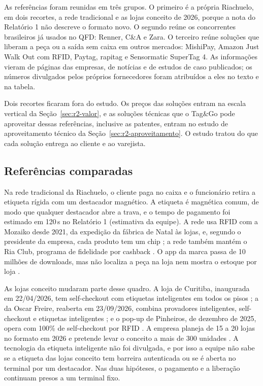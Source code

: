 As referências foram reunidas em três grupos. O primeiro é a própria Riachuelo, em dois recortes, a rede tradicional e as lojas conceito de 2026, porque a nota do Relatório 1 não descreve o formato novo. O segundo reúne os concorrentes brasileiros já usados no QFD: Renner, C\&A e Zara. O terceiro reúne soluções que liberam a peça ou a saída sem caixa em outros mercados: MishiPay, Amazon Just Walk Out com RFID, Paytag, rapitag e Sensormatic SuperTag 4. As informações vieram de páginas das empresas, de notícias e de estudos de caso publicados; os números divulgados pelos próprios fornecedores foram atribuídos a eles no texto e na tabela.

Dois recortes ficaram fora do estudo. Os preços das soluções entram na escala vertical da Seção~\ref{sec:r2-valor}, e as soluções técnicas que o Tag\&Go pode aproveitar dessas referências, inclusive as patentes, entram no estudo de aproveitamento técnico da Seção~\ref{sec:r2-aproveitamento}. O estudo tratou do que cada solução entrega ao cliente e ao varejista.

\subsection{Referências comparadas}
\label{sub:r2-dif-referencias}

Na rede tradicional da Riachuelo, o cliente paga no caixa e o funcionário retira a etiqueta rígida com um destacador magnético. A etiqueta é magnética comum, de modo que qualquer destacador abre a trava, e o tempo de pagamento foi estimado em 120\,s no Relatório 1 (estimativa da equipe). A rede usa RFID com a Mozaiko desde 2021, da expedição da fábrica de Natal às lojas, e, segundo o presidente da empresa, cada produto tem um chip \cite{tiinside2022riachuelo,neofeed2025riachuelo}; a rede também mantém o Ria Club, programa de fidelidade por cashback \cite{midway2026riaclub}. O app da marca passa de 10 milhões de downloads, mas não localiza a peça na loja nem mostra o estoque por loja \cite{googleplay2026riachuelo,appstore2026riachuelo}.

As lojas conceito mudaram parte desse quadro. A loja de Curitiba, inaugurada em 22/04/2026, tem self-checkout com etiquetas inteligentes em todos os pisos \cite{amanha2026riachuelo}; a da Oscar Freire, reaberta em 23/09/2026, combina provadores inteligentes, self-checkout e etiquetas inteligentes \cite{economicnews2026riachuelo}; e o pop-up de Pinheiros, de dezembro de 2025, opera com 100\% de self-checkout por RFID \cite{neofeed2025riachuelo}. A empresa planeja de 15 a 20 lojas no formato em 2026 e pretende levar o conceito a mais de 300 unidades \cite{mercadoconsumo2026riachuelo}. A tecnologia da etiqueta inteligente não foi divulgada, e por isso a equipe não sabe se a etiqueta das lojas conceito tem barreira autenticada ou se é aberta no terminal por um destacador. Nas duas hipóteses, o pagamento e a liberação continuam presos a um terminal fixo.

